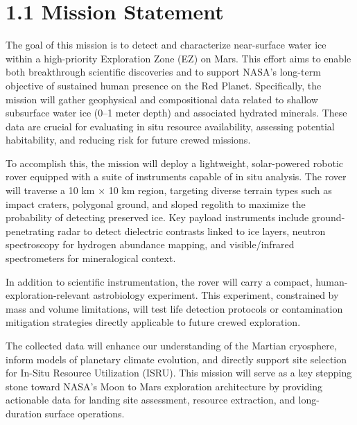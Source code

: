 \section*{1.1 Mission Statement}

The goal of this mission is to detect and characterize near-surface water ice within a high-priority Exploration Zone (EZ) on Mars. This effort aims to enable both breakthrough scientific discoveries and to support NASA's long-term objective of sustained human presence on the Red Planet. Specifically, the mission will gather geophysical and compositional data related to shallow subsurface water ice (0–1 meter depth) and associated hydrated minerals. These data are crucial for evaluating in situ resource availability, assessing potential habitability, and reducing risk for future crewed missions.

To accomplish this, the mission will deploy a lightweight, solar-powered robotic rover equipped with a suite of instruments capable of in situ analysis. The rover will traverse a 10 km × 10 km region, targeting diverse terrain types such as impact craters, polygonal ground, and sloped regolith to maximize the probability of detecting preserved ice. Key payload instruments include ground-penetrating radar to detect dielectric contrasts linked to ice layers, neutron spectroscopy for hydrogen abundance mapping, and visible/infrared spectrometers for mineralogical context.

In addition to scientific instrumentation, the rover will carry a compact, human-exploration-relevant astrobiology experiment. This experiment, constrained by mass and volume limitations, will test life detection protocols or contamination mitigation strategies directly applicable to future crewed exploration.

The collected data will enhance our understanding of the Martian cryosphere, inform models of planetary climate evolution, and directly support site selection for In-Situ Resource Utilization (ISRU). This mission will serve as a key stepping stone toward NASA’s Moon to Mars exploration architecture by providing actionable data for landing site assessment, resource extraction, and long-duration surface operations.